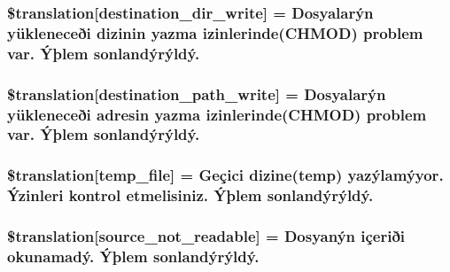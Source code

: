 \subsubsection[{\$translation}]{\setlength{\rightskip}{0pt plus 5cm}\$translation\mbox{[}\textquotesingle{}destination\+\_\+dir\+\_\+write\textquotesingle{}\mbox{]} = \textquotesingle{}Dosyalarýn yükleneceði dizinin yazma izinlerinde(C\+H\+M\+O\+D) problem var. Ýþlem sonlandýrýldý.\textquotesingle{}}\label{class_8upload_8tr___t_r_8php_a97608ea194a616db49141a0e6dee900c}
\hypertarget{class_8upload_8tr___t_r_8php_a40e4e1962226b89fd76da5819a9602b0}{}
\subsubsection[{\$translation}]{\setlength{\rightskip}{0pt plus 5cm}\$translation\mbox{[}\textquotesingle{}destination\+\_\+path\+\_\+write\textquotesingle{}\mbox{]} = \textquotesingle{}Dosyalarýn yükleneceði adresin yazma izinlerinde(C\+H\+M\+O\+D) problem var. Ýþlem sonlandýrýldý.\textquotesingle{}}\label{class_8upload_8tr___t_r_8php_a40e4e1962226b89fd76da5819a9602b0}
\hypertarget{class_8upload_8tr___t_r_8php_a2baece8da11e20d45175db91851ec3e3}{}
\subsubsection[{\$translation}]{\setlength{\rightskip}{0pt plus 5cm}\$translation\mbox{[}\textquotesingle{}temp\+\_\+file\textquotesingle{}\mbox{]} = \textquotesingle{}Geçici dizine(temp) yazýlamýyor. Ýzinleri kontrol etmelisiniz. Ýþlem sonlandýrýldý.\textquotesingle{}}\label{class_8upload_8tr___t_r_8php_a2baece8da11e20d45175db91851ec3e3}
\hypertarget{class_8upload_8tr___t_r_8php_a922967ca2df0efdd455261142d8e5715}{}
\subsubsection[{\$translation}]{\setlength{\rightskip}{0pt plus 5cm}\$translation\mbox{[}\textquotesingle{}source\+\_\+not\+\_\+readable\textquotesingle{}\mbox{]} = \textquotesingle{}Dosyanýn içeriði okunamadý. Ýþlem sonlandýrýldý.\textquotesingle{}}\label{class_8upload_8tr___t_r_8php_a922967ca2df0efdd455261142d8e5715}
\hypertarget{class_8upload_8tr___t_r_8php_a346dfd1ade29f583dd20d345c436859f}{}
